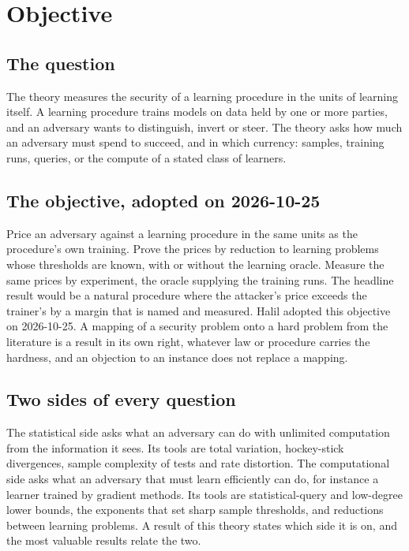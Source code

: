 \chapter{Objective}\label{ch:objective}

\section{The question}
The theory measures the security of a learning procedure in the units of
learning itself. A learning procedure trains models on data held by one or more
parties, and an adversary wants to distinguish, invert or steer. The theory asks
how much an adversary must spend to succeed, and in which currency: samples,
training runs, queries, or the compute of a stated class of learners.

\section{The objective, adopted on 2026-10-25}
Price an adversary against a learning procedure in the same units as the
procedure's own training. Prove the prices by reduction to learning problems
whose thresholds are known, with or without the learning oracle. Measure the
same prices by experiment, the oracle supplying the training runs. The headline
result would be a natural procedure where the attacker's price exceeds the
trainer's by a margin that is named and measured. Halil adopted this objective
on 2026-10-25. A mapping of a security problem onto a hard problem from the
literature is a result in its own right, whatever law or procedure carries
the hardness, and an objection to an instance does not replace a mapping.

\section{Two sides of every question}
The statistical side asks what an adversary can do with unlimited computation
from the information it sees. Its tools are total variation, hockey-stick
divergences, sample complexity of tests and rate distortion. The computational
side asks what an adversary that must learn efficiently can do, for instance a
learner trained by gradient methods. Its tools are statistical-query and
low-degree lower bounds, the exponents that set sharp sample thresholds, and
reductions between learning problems. A result of this theory states which side
it is on, and the most valuable results relate the two.

